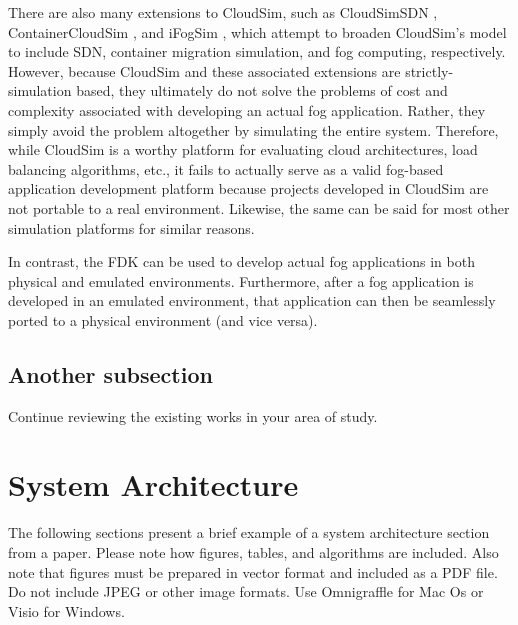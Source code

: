 There are also many extensions to CloudSim, such as CloudSimSDN \cite{cloudsimsdn}, ContainerCloudSim \cite{containercloudsim}, and iFogSim \cite{ifogsim}, which attempt to broaden CloudSim's model to include SDN, container migration simulation, and fog computing, respectively.
However, because CloudSim and these associated extensions are strictly-simulation based, they ultimately do not solve the problems of cost and complexity associated with developing an actual fog application.
Rather, they simply avoid the problem altogether by simulating the entire system. 
Therefore, while CloudSim is a worthy platform for evaluating cloud architectures, load balancing algorithms, etc., it fails to actually serve as a valid fog-based application development platform because projects developed in CloudSim are not portable to a real environment. 
Likewise, the same can be said for most other simulation platforms for similar reasons.

In contrast, the FDK can be used to develop actual fog applications in both physical and emulated environments.
Furthermore, after a fog application is developed in an emulated environment, that application can then be seamlessly ported to a physical environment (and vice versa).


\section{Another subsection}
Continue reviewing the existing works in your area of study.




\chapter{System Architecture}
\label{SystemArchitecture}

The following sections present a brief example of a system architecture section from a paper. Please note how figures, tables, and algorithms are included. 
Also note that figures must be prepared in vector format and included as a PDF file. Do not include JPEG or other image formats.
Use Omnigraffle for Mac Os or Visio for Windows.




